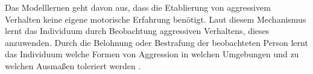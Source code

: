 Das Modelllernen geht davon aus, dass die Etablierung von aggressivem Verhalten keine eigene
motorische Erfahrung benötigt. Laut diesem Mechanismus lernt das Individuum durch Beobachtung
aggressiven Verhaltens, dieses anzuwenden. Durch die Belohnung oder Bestrafung der beobachteten 
Person lernt das Individuum welche Formen von Aggression in welchen Umgebungen und zu welchen 
Ausmaßen toleriert werden \parencite{Aggro_Theorie_Buch}.